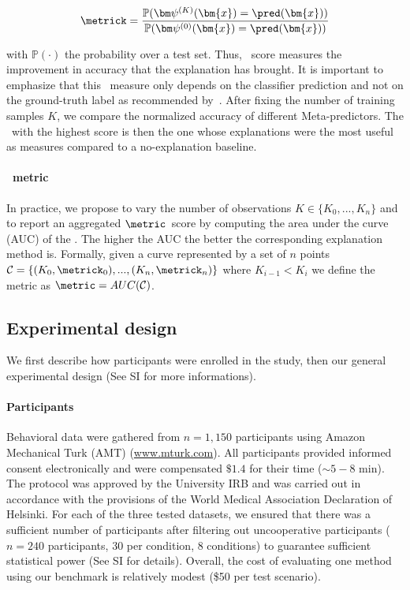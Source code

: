 \begin{equation}
    \label{eq:metapred:metric_k}
    \metrick = \frac{
    \mathbb{P}(\metapred^{(K)}(\bm{x}) = \pred(\bm{x}))
    }{
    \mathbb{P}(\metabase(\bm{x}) = \pred(\bm{x}))
    }
\end{equation}

with $\mathbb{P}(\cdot)$ the probability over a test set. Thus, \metrick~score measures the improvement in accuracy that the explanation has brought. It is important to emphasize that this \metric~measure only depends on the classifier prediction and not on the ground-truth label as recommended by~\cite{jacovi2020towards}. After fixing the number of training samples $K$, we compare the normalized accuracy of different Meta-predictors. The \mp~with the highest score is then the one whose explanations were the most useful as measures compared to a no-explanation baseline. 

\paragraph{\metric~metric} In practice, we propose to vary the number of observations $K \in \{ K_0, ..., K_n \}$ and to report an aggregated $\metric$~score by computing the area under the curve (AUC) of the \metrick. 
The higher the AUC the better the corresponding explanation method is. Formally, given a curve represented by a set of $n$ points $\mathcal{C} = \{ (K_0, \metrick_0), ...,  (K_n, \metrick_n) \}$ where $K_{i-1} < K_i$ we define the metric as $\metric = AUC(\mathcal{C})$. 

\subsection{Experimental design}
\label{sec:metapred:exp_design}

We first describe how participants were enrolled in the study, then our general experimental design (See SI for more informations).

\paragraph{Participants} Behavioral data were gathered from $n=1,150$ participants using Amazon
Mechanical Turk (AMT) ({\url{www.mturk.com}}). 
All participants provided informed consent electronically and were compensated $\$1.4$ for their time ($\sim 5 - 8$ min). The protocol was approved by the University IRB and was carried out in accordance with the provisions of the World Medical Association Declaration of Helsinki. For each of the three tested datasets, we ensured that there was a sufficient number of participants after filtering out uncooperative participants ($n = 240$ participants, 30 per condition, 8 conditions) to guarantee sufficient statistical power (See SI for details).
Overall, the cost of evaluating one method using our benchmark is relatively modest (\$50 per test scenario). 

